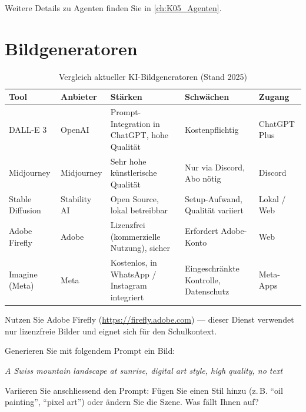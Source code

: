 \begin{myremark}
Weitere Details zu Agenten finden Sie in \cref{ch:K05_Agenten}.
\end{myremark}

\section{Bildgeneratoren}

\begin{table}[H]
\centering
\caption{Vergleich aktueller KI-Bildgeneratoren (Stand 2025)}
\label{tab:bildgen-vergleich}
\small
\begin{tabular}{p{2.5cm}p{2cm}p{3.5cm}p{3.5cm}p{2cm}}
    \toprule
    \textbf{Tool}      & \textbf{Anbieter}    & \textbf{Stärken}                            & \textbf{Schwächen}                     & \textbf{Zugang}   \\
    \midrule
    DALL-E 3           & OpenAI               & Prompt-Integration in ChatGPT, hohe Qualität & Kostenpflichtig                        & ChatGPT Plus      \\
    \midrule
    Midjourney         & Midjourney           & Sehr hohe künstlerische Qualität             & Nur via Discord, Abo nötig             & Discord           \\
    \midrule
    Stable Diffusion   & Stability AI         & Open Source, lokal betreibbar                & Setup-Aufwand, Qualität variiert       & Lokal / Web       \\
    \midrule
    Adobe Firefly      & Adobe                & Lizenzfrei (kommerzielle Nutzung), sicher    & Erfordert Adobe-Konto                  & Web               \\
    \midrule
    Imagine (Meta)     & Meta                 & Kostenlos, in WhatsApp / Instagram integriert & Eingeschränkte Kontrolle, Datenschutz & Meta-Apps         \\
    \bottomrule
\end{tabular}
\end{table}

\begin{myexercise}
Nutzen Sie Adobe Firefly (\url{https://firefly.adobe.com}) --- dieser Dienst
verwendet nur lizenzfreie Bilder und eignet sich für den Schulkontext.

Generieren Sie mit folgendem Prompt ein Bild:
\begin{center}
    \textit{A Swiss mountain landscape at sunrise, digital art style,
    high quality, no text}
\end{center}

Variieren Sie anschliessend den Prompt: Fügen Sie einen Stil hinzu
(z.\,B. \enquote{oil painting}, \enquote{pixel art}) oder ändern Sie
die Szene. Was fällt Ihnen auf?
\end{myexercise}

